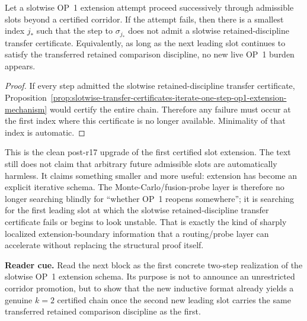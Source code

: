 \begin{corollary}
\label{cor:first-failure-slotwise-extension-attempt-localizes-first-uncertified-leading-slot}
Let a slotwise OP~1 extension attempt proceed successively through admissible slots beyond a certified corridor. If the attempt fails, then there is a smallest index $j_\ast$ such that the step to $\sigma_{j_\ast}$ does not admit a slotwise retained-discipline transfer certificate. Equivalently, as long as the next leading slot continues to satisfy the transferred retained comparison discipline, no new live OP~1 burden appears.
\end{corollary}

\begin{proof}
If every step admitted the slotwise retained-discipline transfer certificate, Proposition~\ref{prop:slotwise-transfer-certificates-iterate-one-step-op1-extension-mechanism} would certify the entire chain. Therefore any failure must occur at the first index where this certificate is no longer available. Minimality of that index is automatic.
\end{proof}

\begin{remark}
\label{rem:what-iterable-slotwise-extension-schema-now-buys}
This is the clean post-r17 upgrade of the first certified slot extension. The text still does not claim that arbitrary future admissible slots are automatically harmless. It claims something smaller and more useful: extension has become an explicit iterative schema. The Monte-Carlo/fusion-probe layer is therefore no longer searching blindly for ``whether OP~1 reopens somewhere''; it is searching for the first leading slot at which the slotwise retained-discipline transfer certificate fails or begins to look unstable. That is exactly the kind of sharply localized extension-boundary information that a routing/probe layer can accelerate without replacing the structural proof itself.
\end{remark}


\noindent\textbf{Reader cue.} Read the next block as the first concrete two-step realization of the slotwise OP~1 extension schema. Its purpose is not to announce an unrestricted corridor promotion, but to show that the new inductive format already yields a genuine $k=2$ certified chain once the second new leading slot carries the same transferred retained comparison discipline as the first.

